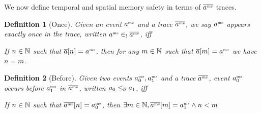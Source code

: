 \documentclass[a4paper,names,dvipsnames]{article}
\newtheorem{definition}{Definition}
\begin{document}


We now define temporal and spatial memory safety in terms of $\mstrace$ traces.

\begin{definition}[Once]
  Given an event $\msevent$ and a trace $\mstrace$, we say $\msevent$ appears exactly once in the trace, written $\msevent\in_{!}\mstrace$, iff

  If $n\in\nat$ such that $\trace{[n]}=\msevent$, then for any $m\in\nat$ such that $\trace{[m]}=\msevent$ we have $n = m$.
\end{definition}

\begin{definition}[Before]
  Given two events $\msevent[_0],\msevent[_1]$ and a trace $\mstrace$, event $\msevent[_0]$ occurs before $\msevent[_1]$ in $\mstrace$, written
  $\event{_0}\le_{\trace}\event{_1}$, iff

  If $n\in\nat$ such that $\mstrace{[n]} = \msevent[_{0}]$, then $\exists m\in\nat, \mstrace{[m]} = \msevent[_1] \wedge n< m$
\end{definition}
\end{document}
